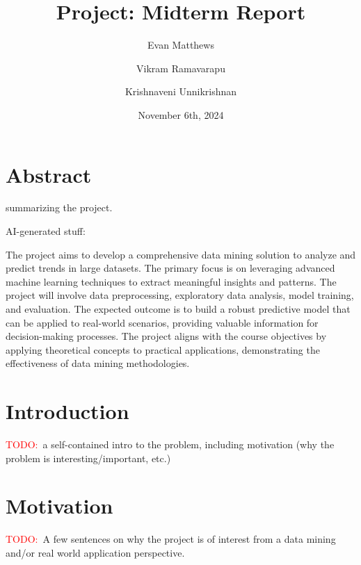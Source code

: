 \documentclass[11pt]{extarticle}
\title{Project: Midterm Report}
\author[1]{Evan Matthews}
\author[1]{Vikram Ramavarapu}
\author[1]{Krishnaveni Unnikrishnan}
\affil[1]{CS 412 Group G6}
\date{November 6th, 2024}
\newcommand{\todo}{\textcolor{red}{TODO:}~}
\begin{document}
\maketitle

\pagebreak


\section{Abstract}
summarizing the project\cite{Pettorruso2020-qt,Cash2012-rb,Aboujaoude2010-mc,Restrepo2020-pb}.

AI-generated stuff:
\begin{mdframed}
    The project aims to develop a comprehensive data mining solution to analyze and predict trends in large datasets. 
    The primary focus is on leveraging advanced machine learning techniques to extract meaningful insights and patterns. 
    The project will involve data preprocessing, exploratory data analysis, model training, and evaluation. 
    The expected outcome is to build a robust predictive model that can be applied to real-world scenarios, providing valuable information for decision-making processes. 
    The project aligns with the course objectives by applying theoretical concepts to practical applications, demonstrating the effectiveness of data mining methodologies.
\end{mdframed}

\section{Introduction}
\todo a self-contained intro to the problem, including motivation 
(why the problem is interesting/important, etc.)

\section{Motivation} 
\todo A few sentences on why the project is of interest from a data mining and/or real world application perspective.
\end{document}
